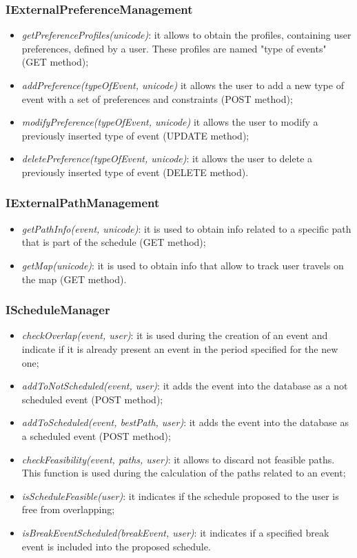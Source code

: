 \subsubsection{IExternalPreferenceManagement}
\begin{itemize}
\item \textit{getPreferenceProfiles(unicode)}: it allows to obtain the profiles, containing user preferences, defined by a user. These profiles are named "type of events" (GET method);
\item \textit{addPreference(typeOfEvent, unicode)} it allows the user to add a new type of event with a set of preferences and constraints (POST method);
\item \textit{modifyPreference(typeOfEvent, unicode)} it allows the user to modify a previously inserted type of event (UPDATE method);
\item \textit{deletePreference(typeOfEvent, unicode)}: it allows the user to delete a previously inserted type of event (DELETE method).
\end{itemize}
\subsubsection{IExternalPathManagement}
\begin{itemize}
\item \textit{getPathInfo(event, unicode)}: it is used to obtain info related to a specific path that is part of the schedule (GET method);
\item \textit{getMap(unicode)}: it is used to obtain info that allow to track user travels on the map (GET method).
\end{itemize}
\subsubsection{IScheduleManager}
\begin{itemize}
\item \textit{checkOverlap(event, user)}: it is used during the creation of an event and indicate if it is already present an event in the period specified for the new one;
\item \textit{addToNotScheduled(event, user)}: it adds the event into the database as a not scheduled event (POST method);
\item \textit{addToScheduled(event, bestPath, user)}: it adds the event into the database as a scheduled event (POST method);
\item \textit{checkFeasibility(event, paths, user)}: it allows to discard not feasible paths. This function is used during the calculation of the paths related to an event;
\item \textit{isScheduleFeasible(user)}: it indicates if the schedule proposed to the user is free from overlapping;
\item \textit{isBreakEventScheduled(breakEvent, user)}: it indicates if a specified break event is included into the proposed schedule.
\end{itemize}
